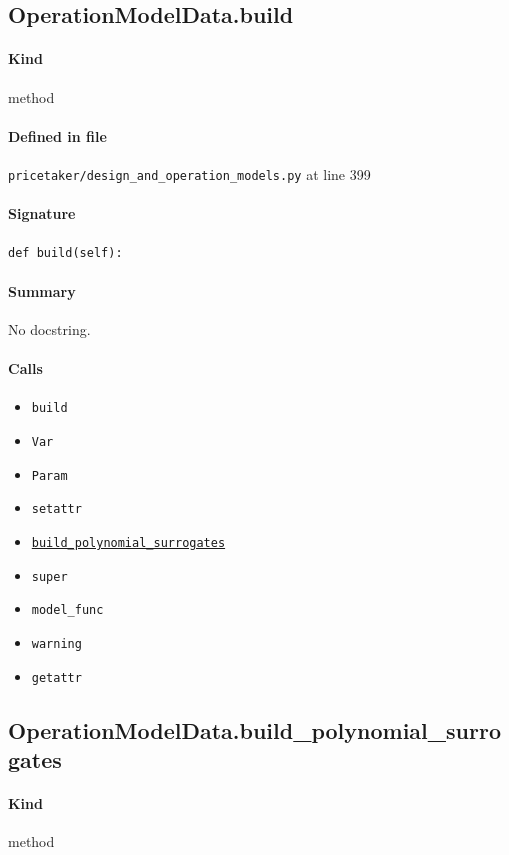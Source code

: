 \documentclass[11pt]{report}
\begin{document}
\subsection{OperationModelData.build}
\label{def:pricetaker-design_and_operation_models.py:OperationModelData.build:L399}
\paragraph{Kind} method
\paragraph{Defined in file} \texttt{pricetaker/design\_and\_operation\_models.py} at line 399
\paragraph{Signature} \texttt{def build(self):}
\paragraph{Summary} No docstring.
\paragraph{Calls}
\begin{itemize}[leftmargin=*]
  \item \texttt{build}
  \item \texttt{Var}
  \item \texttt{Param}
  \item \texttt{setattr}
  \item \hyperref[def:pricetaker-design_and_operation_models.py:OperationModelData.build_polynomial_surrogates:L449]{\texttt{build\_polynomial\_surrogates}}
  \item \texttt{super}
  \item \texttt{model\_func}
  \item \texttt{warning}
  \item \texttt{getattr}
\end{itemize}
\subsection{OperationModelData.build\_polynomial\_surrogates}
\label{def:pricetaker-design_and_operation_models.py:OperationModelData.build_polynomial_surrogates:L449}
\paragraph{Kind} method
\end{document}

